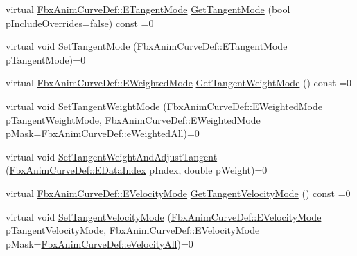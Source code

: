 \begin{DoxyCompactItemize}
\item 
virtual \hyperlink{class_fbx_anim_curve_def_ac810ccc5ca0527704ab5175479964b87}{Fbx\+Anim\+Curve\+Def\+::\+E\+Tangent\+Mode} \hyperlink{class_fbx_anim_curve_key___impl_a220af9fcf94a2fb3e795d1d6f99422f8}{Get\+Tangent\+Mode} (bool p\+Include\+Overrides=false) const =0
\item 
virtual void \hyperlink{class_fbx_anim_curve_key___impl_ac98a07a459c9dabde1a2e4b8da0feb75}{Set\+Tangent\+Mode} (\hyperlink{class_fbx_anim_curve_def_ac810ccc5ca0527704ab5175479964b87}{Fbx\+Anim\+Curve\+Def\+::\+E\+Tangent\+Mode} p\+Tangent\+Mode)=0
\item 
virtual \hyperlink{class_fbx_anim_curve_def_aeee6e9cc12501e10dbd3e5caaf66990e}{Fbx\+Anim\+Curve\+Def\+::\+E\+Weighted\+Mode} \hyperlink{class_fbx_anim_curve_key___impl_a78b901f289d94aafab0b8256c2a865e2}{Get\+Tangent\+Weight\+Mode} () const =0
\item 
virtual void \hyperlink{class_fbx_anim_curve_key___impl_a13388d0e2c45051c57a36aabddd311f9}{Set\+Tangent\+Weight\+Mode} (\hyperlink{class_fbx_anim_curve_def_aeee6e9cc12501e10dbd3e5caaf66990e}{Fbx\+Anim\+Curve\+Def\+::\+E\+Weighted\+Mode} p\+Tangent\+Weight\+Mode, \hyperlink{class_fbx_anim_curve_def_aeee6e9cc12501e10dbd3e5caaf66990e}{Fbx\+Anim\+Curve\+Def\+::\+E\+Weighted\+Mode} p\+Mask=\hyperlink{class_fbx_anim_curve_def_aeee6e9cc12501e10dbd3e5caaf66990ea4337e6853fab642c2a432ab1bb303922}{Fbx\+Anim\+Curve\+Def\+::e\+Weighted\+All})=0
\item 
virtual void \hyperlink{class_fbx_anim_curve_key___impl_a2740276be28a5fb7466c0d9137c50fbb}{Set\+Tangent\+Weight\+And\+Adjust\+Tangent} (\hyperlink{class_fbx_anim_curve_def_a3be261d961f8226235529b148cf80300}{Fbx\+Anim\+Curve\+Def\+::\+E\+Data\+Index} p\+Index, double p\+Weight)=0
\item 
virtual \hyperlink{class_fbx_anim_curve_def_a747576beffa78ab236d2e140da395fff}{Fbx\+Anim\+Curve\+Def\+::\+E\+Velocity\+Mode} \hyperlink{class_fbx_anim_curve_key___impl_ad3a162e0e05faac105c042419645768d}{Get\+Tangent\+Velocity\+Mode} () const =0
\item 
virtual void \hyperlink{class_fbx_anim_curve_key___impl_afa3315cc9dad3459b8eb4abc3c7dae3e}{Set\+Tangent\+Velocity\+Mode} (\hyperlink{class_fbx_anim_curve_def_a747576beffa78ab236d2e140da395fff}{Fbx\+Anim\+Curve\+Def\+::\+E\+Velocity\+Mode} p\+Tangent\+Velocity\+Mode, \hyperlink{class_fbx_anim_curve_def_a747576beffa78ab236d2e140da395fff}{Fbx\+Anim\+Curve\+Def\+::\+E\+Velocity\+Mode} p\+Mask=\hyperlink{class_fbx_anim_curve_def_a747576beffa78ab236d2e140da395fffab8603ba4ecc238f5dee7489b6a0123ee}{Fbx\+Anim\+Curve\+Def\+::e\+Velocity\+All})=0

\end{DoxyCompactItemize}

